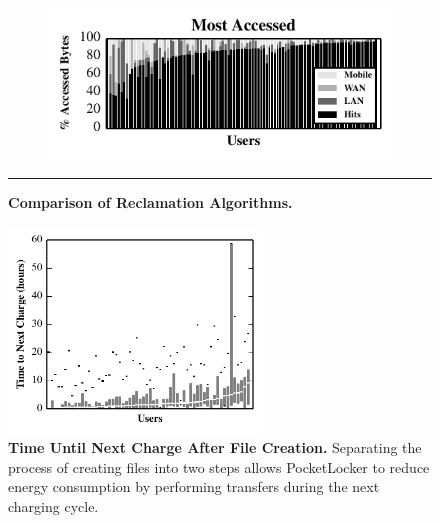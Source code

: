 \begin{figure}[t]
\begin{subfigure}[t]{0.5\columnwidth}
  \end{subfigure}%
  \begin{subfigure}[t]{0.5\columnwidth}

    \includegraphics[width=\columnwidth]{./figures/pocketlocker/AccessSimulatorPerformanceGraph.pdf}

  \end{subfigure}

  \vspace*{-0.1in}

  \caption{\small \textbf{Comparison of Reclamation Algorithms.}}

  \label{fig-simulation-policy}
  
  \vspace*{0.05in}
  
  \hrule
  
  \vspace*{-0.2in}

\end{figure}



\begin{figure}

  \vspace*{-0.3in}

  \includegraphics[width=0.6\textwidth]{./figures/pocketlocker/BatteryLengthDistributionGraph.pdf}
  
  \vspace*{-0.1in}

  \caption{\small \textbf{Time Until Next Charge After File Creation.}
    Separating the process of creating files into two steps allows
  PocketLocker to reduce energy consumption by performing transfers during
the next charging cycle.}
  
  \vspace*{-0.2in}

  \label{fig-simulation-battery}

\end{figure}


